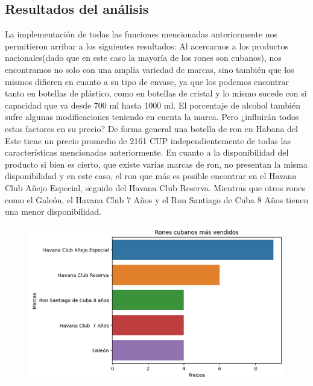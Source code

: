 \documentclass[a4paper,12pt]{article}
\begin{document}
		\subsection{Resultados del análisis}
		La implementación de todas las funciones mencionadas anteriormente nos permitieron arribar a los siguientes resultados: Al acercarnos a los productos nacionales(dado que en este caso la mayoría de los rones son cubanos), nos encontramos no solo con una amplia variedad de marcas, sino también que los mismos difieren en cuanto a su tipo de envase, ya que los podemos encontrar tanto en botellas de plástico, como en botellas de cristal y lo mismo sucede con si capacidad que va desde 700 ml hasta 1000 ml. El porcentaje de alcohol también sufre algunas modificaciones teniendo en cuenta la marca. Pero ¿influirán todos estos factores en su precio? De forma general una botella de ron en Habana del Este tiene un precio promedio de 2161 CUP independientemente de todas las características mencionadas anteriormente. En cuanto a la disponibilidad del producto si bien es cierto, que existe varias marcas de ron, no presentan la misma disponibilidad y en este caso, el ron que más es posible encontrar en el Havana Club Añejo Especial, seguido del Havana Club Reserva. Mientras que otros rones como el Galeón, el Havana Club 7 Años y el Ron Santiago de Cuba 8 Años tienen una menor disponibilidad.
		
		\begin{figure}[h]
			\centering
			\includegraphics[width=12cm]{cuban rum.png}
			\label{fig:Disponibilidad de los rones cubanos}
		\end{figure}
		
\end{document}
